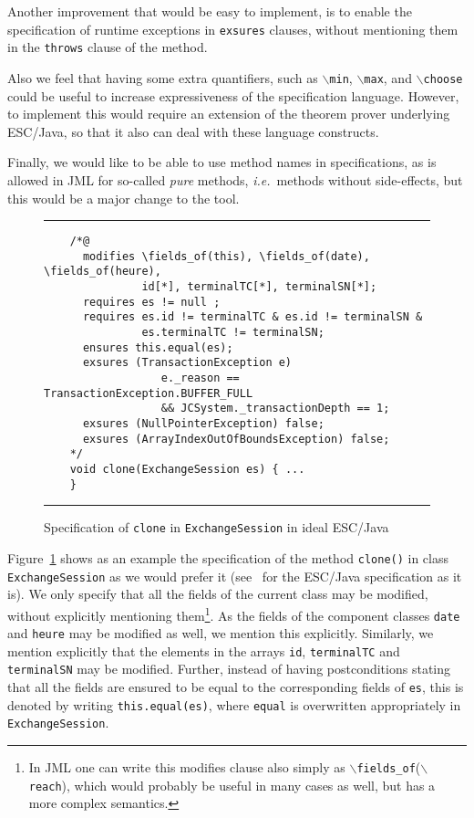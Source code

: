 \documentclass[a4paper]{llncs}
\newcommand{\fieldsof}{\(\backslash\)\texttt{fields\_of}}
\newcommand{\reach}{\(\backslash\)\texttt{reach}}
\begin{document}
Another improvement that would be easy to implement, is to enable the
specification of runtime exceptions in \texttt{exsures} clauses,
without mentioning them in the \texttt{throws} clause of the method.

Also we feel that having some extra quantifiers, such as
\texttt{\(\backslash\)min},
\texttt{\(\backslash\)max}, and \texttt{\(\backslash\)choose} could be 
useful to increase expressiveness of the specification
language. However, to implement this would require an extension of the 
theorem prover underlying ESC/Java, so that it also can deal with
these language constructs.

Finally, we would like to be able to use method
names in specifications, as is allowed in JML for so-called
\emph{pure} methods, \emph{i.e.}~methods without
side-effects, but this would be a major change to the tool.


\begin{figure}[t]
\rule{\linewidth}{0.3mm}
\begin{verbatim}
    /*@
      modifies \fields_of(this), \fields_of(date), \fields_of(heure),
               id[*], terminalTC[*], terminalSN[*];
      requires es != null ;
      requires es.id != terminalTC & es.id != terminalSN &
               es.terminalTC != terminalSN;
      ensures this.equal(es);
      exsures (TransactionException e) 
                  e._reason == TransactionException.BUFFER_FULL 
                  && JCSystem._transactionDepth == 1; 
      exsures (NullPointerException) false;
      exsures (ArrayIndexOutOfBoundsException) false;
    */
    void clone(ExchangeSession es) { ...
    } 
\end{verbatim}
\caption{Specification of \texttt{clone} in \texttt{ExchangeSession}
in ideal ESC/Java}
\label{FigIdealESC}
\rule{\linewidth}{0.3mm}
\end{figure}

Figure~\ref{FigIdealESC} shows as an example the
specification of the method \texttt{clone()} in class
\texttt{ExchangeSession} as we would prefer it (see~\cite{CatanoH01Url} for the
ESC/Java specification as it is). We only specify that all the fields
of the current class may be modified, without explicitly mentioning
them\footnote{In JML one can write this modifies clause also
simply as \fieldsof(\reach), which would probably be useful in many
cases as well, but has a more complex semantics.}. As the fields of the component classes \texttt{date} and
\texttt{heure} may be modified as well, we mention this
explicitly. Similarly, we mention explicitly that the elements in the
arrays \texttt{id}, \texttt{terminalTC} and \texttt{terminalSN} may be
modified. Further, instead of
having postconditions stating that all the fields are ensured to be
equal to the corresponding fields of \texttt{es}, this is denoted by
writing \texttt{this.equal(es)}, where \texttt{equal} is overwritten
appropriately in \texttt{ExchangeSession}.
\end{document}
